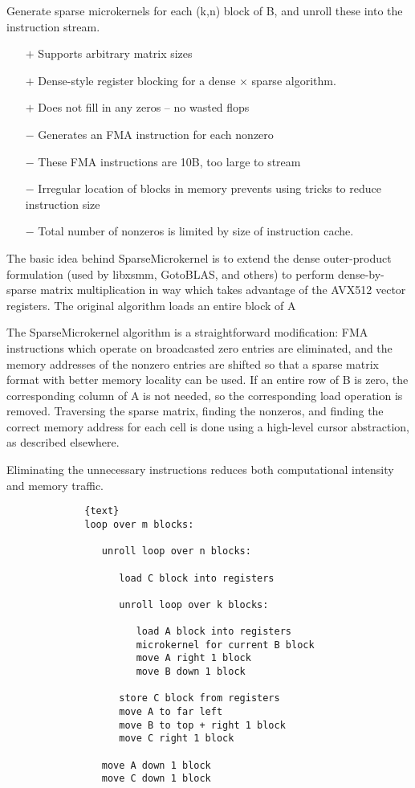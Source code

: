 Generate sparse microkernels for each (k,n) block of B, and unroll these into the instruction stream.
\begin{itemize}
      \item[$+$] Supports arbitrary matrix sizes
      \item[$+$] Dense-style register blocking for a dense $\times$ sparse algorithm.
      \item[$+$] Does not fill in any zeros -- no wasted flops

      \item[$-$] Generates an FMA instruction for each nonzero
      \item[$-$] These FMA instructions are 10B, too large to stream
      \item[$-$] Irregular location of blocks in memory prevents using tricks to reduce instruction size
      \item[$-$] Total number of nonzeros is limited by size of instruction cache.

\end{itemize}

The basic idea behind SparseMicrokernel is to extend the dense outer-product formulation (used
by libxsmm, GotoBLAS, and others) to perform dense-by-sparse matrix multiplication in way which
takes advantage of the AVX512 vector registers. The original algorithm loads an entire block of A


The SparseMicrokernel algorithm is a straightforward modification: FMA instructions which operate on 
broadcasted zero entries are eliminated, and the memory addresses of the nonzero entries are 
shifted so that a sparse matrix format with better memory locality can be used. If an entire 
row of B is zero, the corresponding column of A is not needed, so the corresponding load 
operation is removed. Traversing the sparse matrix, finding the nonzeros, and finding the correct
memory address for each cell is done using a high-level cursor abstraction, as described elsewhere.   

Eliminating the unnecessary instructions reduces both computational intensity and memory traffic.


\begin{figure}[ht]
      \begin{verbatim}
        {text}
        loop over m blocks:

           unroll loop over n blocks:

              load C block into registers

              unroll loop over k blocks:

                 load A block into registers
                 microkernel for current B block
                 move A right 1 block
                 move B down 1 block

              store C block from registers
              move A to far left
              move B to top + right 1 block
              move C right 1 block

           move A down 1 block
           move C down 1 block
      \end{verbatim}
\end{figure}



